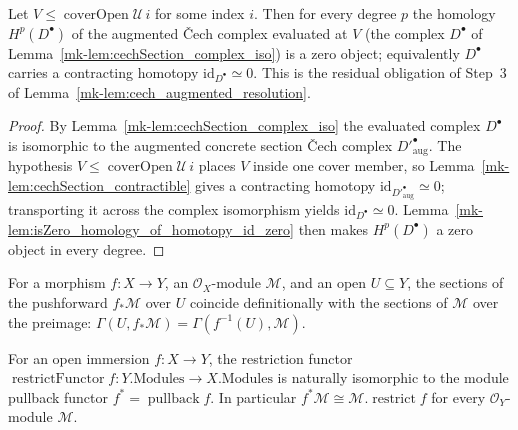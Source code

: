 \begin{lemma}\label{mk-lem:cechSection_isZero_homology}
  \leanok

  Let \(V \le \operatorname{coverOpen}\mathcal{U}\,i\) for some index \(i\). Then for every
  degree \(p\) the homology \(H^p(D^\bullet)\) of the augmented {\v C}ech complex evaluated at
  \(V\) (the complex \(D^\bullet\) of Lemma~\ref{mk-lem:cechSection_complex_iso}) is a zero
  object; equivalently \(D^\bullet\) carries a contracting homotopy \(\mathrm{id}_{D^\bullet}
  \simeq 0\). This is the residual obligation of Step~3 of
  Lemma~\ref{mk-lem:cech_augmented_resolution}.
\end{lemma}
\begin{proof}
  \leanok
    By Lemma~\ref{mk-lem:cechSection_complex_iso} the evaluated complex \(D^\bullet\) is
  isomorphic to the augmented concrete section {\v C}ech complex \(D'^\bullet_{\mathrm{aug}}\).
  The hypothesis \(V \le \operatorname{coverOpen}\mathcal{U}\,i\) places \(V\) inside one cover
  member, so Lemma~\ref{mk-lem:cechSection_contractible} gives a contracting homotopy
  \(\mathrm{id}_{D'^\bullet_{\mathrm{aug}}} \simeq 0\); transporting it across the complex
  isomorphism yields \(\mathrm{id}_{D^\bullet} \simeq 0\).
  Lemma~\ref{mk-lem:isZero_homology_of_homotopy_id_zero} then makes
  \(H^p(D^\bullet)\) a zero object in every degree.
\end{proof}

\begin{lemma}
  \label{mk-lem:pushforward_obj_obj_mathlib}
  \mathlibok

  For a morphism \(f : X \to Y\), an \(\mathcal{O}_X\)-module \(\mathcal{M}\), and an open
  \(U \subseteq Y\), the sections of the pushforward \(f_*\mathcal{M}\) over \(U\) coincide
  definitionally with the sections of \(\mathcal{M}\) over the preimage:
  \(\Gamma(U, f_*\mathcal{M}) = \Gamma(f^{-1}(U), \mathcal{M})\).
\end{lemma}

\begin{lemma}
  \label{mk-lem:restrictFunctorIsoPullback_mathlib}
  \mathlibok

  For an open immersion \(f : X \to Y\), the restriction functor
  \(\operatorname{restrictFunctor} f : Y.\mathrm{Modules} \to X.\mathrm{Modules}\) is
  naturally isomorphic to the module pullback functor \(f^* = \operatorname{pullback} f\). In
  particular \(f^*\mathcal{M} \cong \mathcal{M}.\operatorname{restrict} f\) for every
  \(\mathcal{O}_Y\)-module \(\mathcal{M}\).
\end{lemma}

